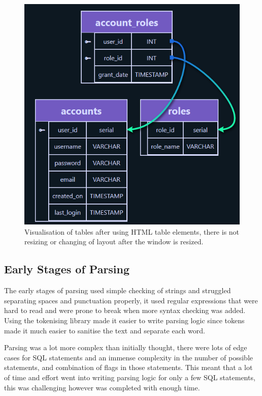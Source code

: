 \begin{figure}[h!]
	\centering
	\includegraphics[scale=0.7]{newPostSquash}
	\caption{Visualisation of tables after using HTML table elements, there is not resizing or changing of layout after the window is resized.}
	\label{fig:afterSquash}
\end{figure}

\subsection{Early Stages of Parsing}

The early stages of parsing used simple checking of strings and struggled separating spaces and punctuation properly, it used regular expressions that were hard to read and were prone to break when more syntax checking was added. Using the tokenising library made it easier to write parsing logic since tokens made it much easier to sanitise the text and separate each word.

Parsing was a lot more complex than initially thought, there were lots of edge cases for SQL statements and an immense complexity in the number of possible statements, and combination of flags in those statements. This meant that a lot of time and effort went into writing parsing logic for only a few SQL statements, this was challenging however was completed with enough time. 

